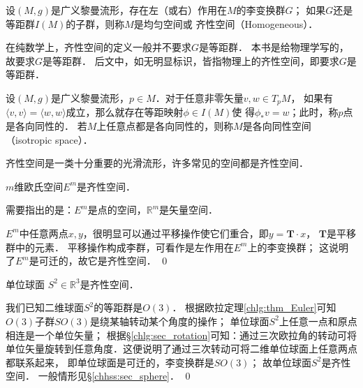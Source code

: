 \begin{definition}\label{chhss:def_Homogeneous}
    设$(M,g)$是广义黎曼流形，存在左（或右）作用在$M$的李变换群$G$；
    如果$G$还是等距群$I(M)$的子群，则称$M$是{\heiti 均匀空间}或
    {\heiti 齐性空间}（Homogeneous）．
\end{definition}

在纯数学上，齐性空间的定义一般并不要求$G$是等距群．
本书是给物理学写的，故要求$G$是等距群．
后文中，如无明显标识，皆指物理上的齐性空间，即要求$G$是等距群．


\begin{definition}\label{chhss:def_isotropic-space}
    设$(M,g)$是广义黎曼流形，$p\in M$．对于任意非零矢量$v,w \in T_p M$，
    如果有$\langle v, v \rangle = \langle w, w \rangle$成立，那么就存在等距映射$\phi\in I(M)$使
    得$\phi_* v = w$；此时，称$p$点是{\heiti 各向同性的}．
    若$M$上任意点都是各向同性的，则称$M$是{\heiti 各向同性空间}（isotropic space）．
\end{definition}




齐性空间是一类十分重要的光滑流形，许多常见的空间都是齐性空间．


\begin{example}
    $m$维欧氏空间$E^m$是齐性空间．
\end{example}

需要指出的是：$E^m$是{\kaishu 点}的空间，$\mathbb{R}^m$是{\kaishu 矢量}空间．

$E^m$中任意两点$x,y$，很明显可以通过平移操作使它们重合，即$y=\boldsymbol{T}\cdot x$，
$\boldsymbol{T}$是平移群中的元素．
平移操作构成李群，可看作是左作用在$E^m$上的李变换群；
这说明了$E^m$是可迁的，故它是齐性空间．
\qed

\begin{example}
    单位球面 $S^2 \in \mathbb{R}^{3}$是齐性空间．
\end{example}
我们已知二维球面$S^2$的等距群是$O(3)$．
根据欧拉定理\ref{chlg:thm_Euler}可知$O(3)$子群$SO(3)$是绕某轴转动某个角度的操作；
单位球面$S^2$上任意一点和原点相连是一个单位矢量；
根据\S\ref{chlg:sec_rotation}可知：通过三次欧拉角的转动可将
单位矢量旋转到任意角度．这便说明了通过三次转动可将二维单位球面上任意两点都联系起来，
即单位球面是可迁的，李变换群是$SO(3)$；
故单位球面$S^2$是齐性空间．  
一般情形见\S\ref{chhss:sec_sphere}． \qed






